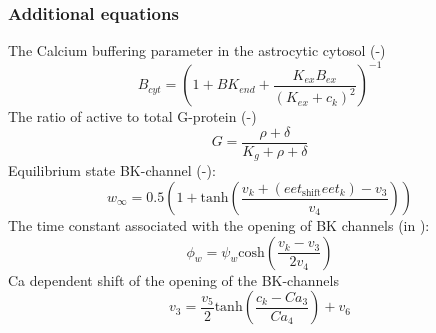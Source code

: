 \subsubsection{Additional equations}
The Calcium buffering parameter in the astrocytic cytosol (-)
\begin{equation} \label{eq:B_cyt}
B_{cyt}=\left(1+BK_{end}+ \frac{K_{ex}B_{ex}}{(K_{ex}+c_k)^2}\right)^{-1} 
\end{equation}
The ratio of active to total G-protein (-)
\begin{equation} \label{eq:G}
G=\frac{\rho+\delta}{K_g+\rho+\delta}
\end{equation}
Equilibrium state BK-channel (-):
\begin{equation} \label{eq:winf}
w_{\infty}=0.5 \left(1+\mathrm{tanh}\left(\frac{v_{k}+(eet_{\mathrm{shift}}eet_k)-v_{3} }{v_{4}} \right)  \right) 
\end{equation}
%
The time constant associated with the opening of BK channels	 (in \pers):
\begin{equation} \label{eq:phin}
\phi_{w}=\psi_{w}\mathrm{cosh}\left( \frac{v_{k}-v_{3}}{2v_{4}}\right) 
\end{equation}
\gls{Ca} dependent shift of the opening of the BK-channels
\begin{equation} \label{eq:v_3}
v_{3}=\frac{v_5}{2}\mathrm{tanh}\left( \frac{c_k-Ca_3}{Ca_4}\right)+v_6 
\end{equation}

